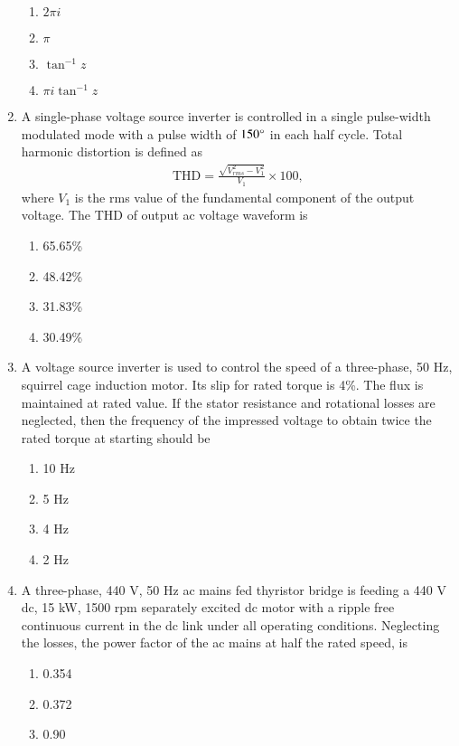 \documentclass[journal]{IEEEtran}
\begin{document}
\begin{enumerate}
\begin{enumerate}
    \item $2 \pi i$
    \item $\pi$
    \item $\tan^{-1}z$
    \item $\pi i \tan^{-1}z$ \\
\end{enumerate}
\item A single-phase voltage source inverter is controlled in a single pulse-width modulated mode with a pulse width of $150\degree$ in each half cycle. Total harmonic distortion is defined as 
\begin{align*}
    \text{THD} = \frac{\sqrt{V_{rms}^2 - V_1^2}}{V_1} \times 100, 
\end{align*}where $V_1$ is the rms value of the fundamental component of the output voltage. The THD of output ac voltage waveform is
\begin{enumerate}
    \item 65.65\%
    \item 48.42\%
    \item 31.83\%
    \item 30.49\% \\
\end{enumerate}
\item A voltage source inverter is used to control the speed of a three-phase, 50 Hz, squirrel cage induction motor. Its slip for rated torque is 4\%. The flux is maintained at rated value. If the stator resistance and rotational losses are neglected, then the frequency of the impressed voltage to obtain twice the rated torque at starting should be
 \begin{enumerate}
     \item 10 Hz
     \item 5 Hz
     \item 4 Hz
     \item 2 Hz \\
 \end{enumerate}
\item A three-phase, 440 V, 50 Hz ac mains fed thyristor bridge is feeding a 440 V dc, 15 kW, 1500 rpm separately excited dc motor with a ripple free continuous current in the dc link under all operating conditions. Neglecting the losses, the power factor of the ac mains at half the rated speed, is
\begin{enumerate}
     \item 0.354
     \item 0.372
     \item 0.90

\end{enumerate}
\end{enumerate}
\end{document}
